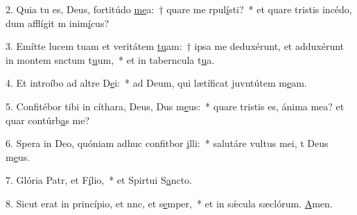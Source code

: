 2. Quia tu es, Deus, fortitúdo \uline{me}a:~† quare me rpul\uline{í}sti?~* et quare tristis incédo, dum afflígit m inim\uline{í}cus?\par 
3. Emítte lucem tuam et veritátem \uline{tu}am:~† ipsa me deduxérunt, et adduxérunt in montem snctum t\uline{u}um,~* et in taberncula t\uline{u}a.\par 
4. Et introíbo ad altre D\uline{e}i:~* ad Deum, qui lætíficat juvntútem m\uline{e}am.\par 
5. Confitébor tibi in cíthara, Deus, Dus m\uline{e}us:~* quare tristis es, ánima mea? et quar contúrb\uline{a}s me?\par 
6. Spera in Deo, quóniam adhuc confitbor \uline{i}lli:~* salutáre vultus mei, t Deus m\uline{e}us.\par 
7. Glória Patr, et F\uline{í}lio,~* et Spirtui S\uline{a}ncto.\par 
8. Sicut erat in princípio, et nnc, et s\uline{e}mper,~* et in sǽcula sæclórum. \uline{A}men.\par 
